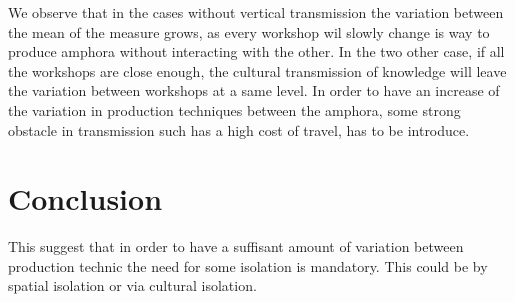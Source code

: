\documentclass[a4paper]{article}
\begin{document}
    We observe that in the cases without vertical transmission the variation between the mean of the measure grows, as every workshop wil slowly change is way to produce amphora without interacting with the other. In the two other case, if all the workshops are close enough, the cultural transmission of knowledge will leave the variation between workshops at a same level. In order to have an increase of the variation in production techniques between the amphora, some strong obstacle in transmission such has a high cost of travel, has to be introduce.

    \section{Conclusion}
    
    This suggest that in order to have a suffisant amount of variation between production technic the need for some isolation is mandatory. This could be by spatial isolation or via cultural isolation. 
 


%
%
%
%
\end{document}
